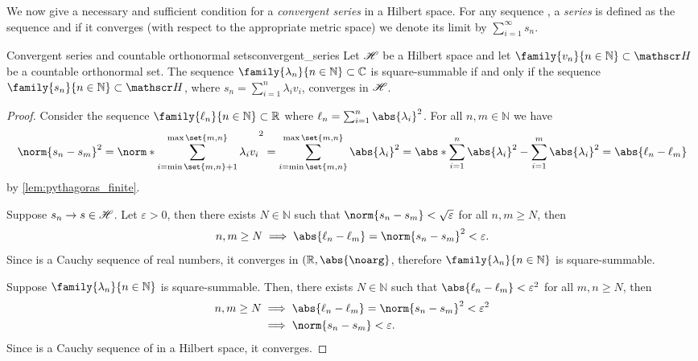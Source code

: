 We now give a necessary and sufficient condition for a \emph{convergent series} in a Hilbert space. For any sequence , a \emph{series} is defined as the sequence  and if it converges (with respect to the appropriate metric space) we denote its limit by \(\sum_{i=1}^\infty s_n\).
\begin{proposition}{Convergent series and countable orthonormal sets}{convergent_series}
    Let \(\mathscr{H}\) be a Hilbert space and let \(\family{v_n}{n\in \mathbb{N}}\subset \hilbert\) be a countable orthonormal set. The sequence \(\family{\lambda_n}{n\in \mathbb{N}} \subset \mathbb{C}\) is square-summable if and only if the sequence \(\family{s_n}{n\in \mathbb{N}} \subset \hilbert\), where \(s_n = \sum_{i=1}^n \lambda_i v_i\), converges in \(\mathscr{H}\).
\end{proposition}
\begin{proof}
    Consider the sequence \(\family{\ell_n}{n\in \mathbb{N}} \subset \mathbb{R}\) where \(\ell_n = \sum_{i = 1}^n \abs{\lambda_i}^2\). For all \(n,m \in \mathbb{N}\) we have
    \begin{equation*}
        \norm{s_n - s_m}^2 = \norm*{\sum_{i = \min\set{m,n} + 1}^{\max\set{m,n}} \lambda_i v_i}^2 = \sum_{i=\min\set{m,n}}^{\max{\set{m,n}}} \abs{\lambda_i}^2 = \abs*{\sum_{i=1}^n \abs{\lambda_i}^2 - \sum_{i=1}^m \abs{\lambda_i}^2} = \abs{\ell_n - \ell_m}
    \end{equation*}
    by \cref{lem:pythagoras_finite}.

    Suppose \(s_n \to s \in \mathscr{H}\). Let \(\varepsilon > 0\), then there exists \(N \in \mathbb{N}\) such that \(\norm{s_n - s_m} < \sqrt{\varepsilon}\) for all \(n, m \geq N\), then
    \begin{equation*}
        n, m \geq N \implies \abs{\ell_n - \ell_m} = \norm{s_n - s_m}^2 < \varepsilon.
    \end{equation*}
    Since  is a Cauchy sequence of real numbers, it converges in \((\mathbb{R}, \abs{\noarg}\), therefore \(\family{\lambda_n}{n \in \mathbb{N}}\) is square-summable.

    Suppose \(\family{\lambda_n}{n \in \mathbb{N}}\) is square-summable. Then, there exists \(N \in \mathbb{N}\) such that \(\abs{\ell_n - \ell_m} < \varepsilon^2\) for all \(m,n \geq N\), then
    \begin{align*}
        n, m \geq N &\implies \abs{\ell_n - \ell_m} = \norm{s_n - s_m}^2 < \varepsilon^2\\
                    &\implies \norm{s_n - s_m} < \varepsilon.
    \end{align*}
    Since  is a Cauchy sequence of in a Hilbert space, it converges.
\end{proof}

